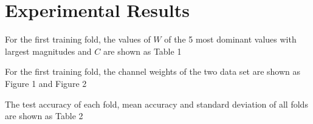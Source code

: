 \documentclass{article}
\begin{document}
\section{Experimental Results}

For the first training fold, the values of $W$ of the 5 most dominant values with largest magnitudes and $C$ are shown as Table 1

\begin{table}[htbp]
\end{table}
\raggedright
For the first training fold, the channel weights of the two data set are shown as Figure 1 and Figure 2

\raggedright
The test accuracy of each fold, mean accuracy and standard deviation of all folds are shown as Table 2
\end{document}
